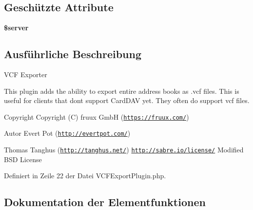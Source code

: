 \subsection*{Geschützte Attribute}
\begin{DoxyCompactItemize}
\item 
\mbox{\label{class_sabre_1_1_card_d_a_v_1_1_v_c_f_export_plugin_a8869c86c2980b540ec95c646a520c9c3}} 
{\bfseries \$server}
\end{DoxyCompactItemize}


\subsection{Ausführliche Beschreibung}
V\+CF Exporter

This plugin adds the ability to export entire address books as .vcf files. This is useful for clients that don\textquotesingle{}t support Card\+D\+AV yet. They often do support vcf files.

\begin{DoxyCopyright}{Copyright}
Copyright (C) fruux GmbH (\href{https://fruux.com/}{\tt https\+://fruux.\+com/}) 
\end{DoxyCopyright}
\begin{DoxyAuthor}{Autor}
Evert Pot (\href{http://evertpot.com/}{\tt http\+://evertpot.\+com/}) 

Thomas Tanghus (\href{http://tanghus.net/}{\tt http\+://tanghus.\+net/})  \href{http://sabre.io/license/}{\tt http\+://sabre.\+io/license/} Modified B\+SD License 
\end{DoxyAuthor}


Definiert in Zeile 22 der Datei V\+C\+F\+Export\+Plugin.\+php.



\subsection{Dokumentation der Elementfunktionen}
\mbox{\label{class_sabre_1_1_card_d_a_v_1_1_v_c_f_export_plugin_a9fdbf212e5f7b5a73803f21f8f26ab2d}} 
